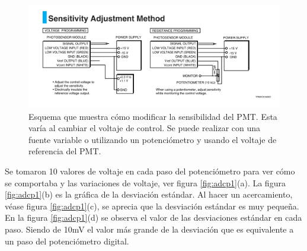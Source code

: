 \begin{figure}[h]
	\centering
	\includegraphics[width=0.9\linewidth]{Imagenes/3/PMTsen}
	\caption[Sensibilidad del PMT.]{Esquema que muestra cómo modificar la sensibilidad del PMT. Esta varía al cambiar el voltaje de control. Se puede realizar con una fuente variable o utilizando un potenciómetro y usando el voltaje de referencia del PMT. \cite{H8249}}
	\label{fig:pmtsen}
\end{figure}
Se tomaron 10 valores de voltaje en cada paso del potenciómetro para ver cómo se comportaba y las variaciones de voltaje, ver figura \ref{fig:adcp1}(a). La figura \ref{fig:adcp1}(b) es la gráfica de la desviación estándar. Al hacer un acercamiento, véase figura \ref{fig:adcp1}(c), se aprecia que la desviación estándar es muy pequeña. En la figura \ref{fig:adcp1}(d) se observa el valor de las desviaciones estándar en cada paso. Siendo de 10mV el valor más grande de la desviación que es equivalente a un paso del potenciómetro digital. 

